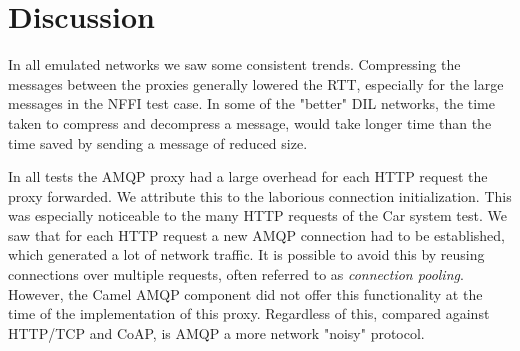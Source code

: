 \begin{landscape}
    \begin{figure}
    \centering
    \begin{floatrow}
    \end{floatrow}
    \end{figure}
\end{landscape}

\section{Discussion}
\label{section:evaluation-discussion}

In all emulated networks we saw some consistent trends. Compressing the messages
between the proxies generally lowered the RTT, especially for the large messages
in the NFFI test case. In some of the "better" DIL networks, the time taken to
compress and decompress a message, would take longer time than the time saved by
sending a message of reduced size.

In all tests the AMQP proxy had a large overhead for each HTTP request the proxy
forwarded. We attribute this to the laborious connection initialization. This
was especially noticeable to the many HTTP requests of the Car system test. We
saw that for each HTTP request a new AMQP connection had to be established,
which generated a lot of network traffic. It is possible to avoid this by
reusing connections over multiple requests, often referred to as
\textit{connection pooling}. However, the Camel AMQP component did not offer
this functionality at the time of the implementation of this proxy. Regardless
of this, compared against HTTP/TCP and CoAP, is AMQP a more network "noisy"
protocol.

